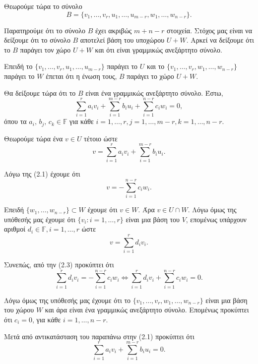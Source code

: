 \documentclass[12pt, a4paper]{book}
\begin{document}
Θεωρούμε τώρα το σύνολο
\begin{displaymath}
Β=\{v_1,…,v_r, u_1,…,u_{m-r}, w_1,…,w_{n-r}\}.
\end{displaymath}

Παρατηρούμε ότι το σύνολο $Β$ έχει ακριβώς $m+n-r$ στοιχεία. Στόχος μας είναι να δείξουμε ότι το σύνολο $Β$ αποτελεί βάση του υποχώρου $U+W$. Αρκεί να δείξουμε ότι το $Β$ παράγει τον χώρο $U+W$ και ότι είναι γραμμικώς ανεξάρτητο σύνολο.

Επειδή το $\{v_1,…,v_r,u_1,…,u_{m-r}\}$ παράγει το $U$ και το $\{v_1,…,v_r,w_1,…,w_{n-r}\}$ παράγει το $W$ έπεται ότι η ένωση τους, $Β$ παράγει το χώρο $U+W$. 

Θα δείξουμε τώρα ότι το $Β$ είναι ένα γραμμικώς ανεξάρτητο σύνολο.
Έστω, 
\begin{equation}
\sum_{i=1}^ra_iv_i + \sum_{i=1}^{m-r}b_iu_i + \sum_{i=1}^{n-r}c_iw_i=0,
\end{equation}
όπου τα $a_i,\, b_j,\, c_k \in \mathbb{F}$ για κάθε  $i = 1,…,r, j=1,…,m-r, k=1,…,n-r$.

Θεωρούμε τώρα ένα $v \in U$ τέτοιο ώστε
\begin{equation}
v = \sum_{i=1}^ra_iv_i + \sum_{i=1}^{m-r}b_iu_i.
\end{equation}

Λόγω της (2.1) έχουμε ότι
\begin{equation}
v= - \sum_{i=1}^{n-r}c_iw_i.
\end{equation}

Επειδή  $\{w_1,…,w_{n-r}\} \subset W$ έχουμε ότι $v \in W$. Άρα $v \in U \cap W$. Λόγω όμως της υπόθεσής μας έχουμε ότι $\{v_i: i = 1,…,r\}$ είναι μια βάση του $V$, επομένως υπάρχουν αριθμοί $d_i \in \mathbb{F}, i = 1,…,r$ ώστε
\begin{displaymath}
v = \sum_{i=1}^rd_iv_i.
\end{displaymath}

Συνεπώς, από την (2.3) προκύπτει ότι
\begin{displaymath}
\sum_{i=1}^rd_iv_i = - \sum_{i=1}^{n-r}c_iw_i \Leftrightarrow \sum_{i=1}^rd_iv_i + \sum_{i=1}^{n-r}c_iw_i = 0.
\end{displaymath} 

Λόγω όμως της υπόθεσής μας έχουμε ότι το $\{v_1,…,v_r,w_1,…,w_{n-r}\}$ είναι μια βάση του χώρου $W$ και άρα είναι ένα γραμμικώς ανεξάρτητο σύνολο. Επομένως προκύπτει ότι $c_i = 0$, για κάθε $i = 1,…,n-r$. 

Μετά από αντικατάσταση του παραπάνω στην (2.1) προκύπτει ότι 
\begin{displaymath}
\sum_{i=1}^ra_iv_i + \sum_{i=1}^{m-r}b_iu_i =0.
\end{displaymath}
\end{document}

